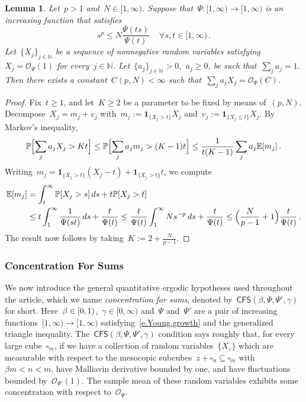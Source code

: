 \documentclass[11pt,twoside]{article} %
\let\oldsquare\square %
\renewcommand{\square}{\oldsquare}
\numberwithin{equation}{section}
\newtheorem{lemma}[theorem]{Lemma}
\theoremstyle{definition}
\let\originalleft\left
\let\originalright\right
\renewcommand{\left}{\mathopen{}\mathclose\bgroup\originalleft}
\renewcommand{\right}{\aftergroup\egroup\originalright}
\newcommand*{\N}{\ensuremath{\mathbb{N}}}
\newcommand{\cu}{\square}
\renewcommand{\P}{\mathbb{P}}
\newcommand{\E}{\mathbb{E}}
\renewcommand{\O}{\mathcal{O}}
\newcommand{\indc}{\boldsymbol{1}}
\newcommand{\CFS}{\mathsf{CFS}}
\begin{document}
\begin{lemma} 
\label{e.supp.you.up}
Let~$p>1$ and~$N \in [1,\infty)$. Suppose that~$\Psi:[1,\infty) \to [1,\infty)$ is an increasing function that satisfies
\begin{equation}  \label{e.Psi.pgrowth.supplementary1}
s^p \leq N \frac{\Psi(t s)}{\Psi(t)}\,
\quad \forall s, t \in [1,\infty) \,.
\end{equation}
Let~$\{ X_j \}_{j\in\N}$ be a sequence of nonnegative random variables satisfying~$X_j = \O_{\Psi}(1)$ for every~$j \in \N$. Let~$\{ a_j\}_{j \in \N}>0$,~$a_j \geq 0$, be such that~$\sum_j a_j =1$. Then there exists a constant~$C(p,N) < \infty$ such that~$\sum_{j} a_j X_j = \O_\Psi(C)$.  
\end{lemma}
\begin{proof}
Fix~$t \geq 1$, and let~$K\geq 2$ be a parameter to be fixed by means of~$(p,N)$. Decompose~$X_j = m_j + v_j$ with~$m_j := \indc_{\{X_j>t \} } X_j$ and~$v_j := \indc_{\{X_j \leq t \} } X_j$. By Markov's inequality, 
\begin{equation*}  
\P\Bigl[ \sum_j a_j X_j > K t  \Bigr] \leq \P\Bigl[ \sum_j a_j m_j > (K-1)t  \Bigr] 
\leq
\frac{1}{t(K-1)}\sum_{j} a_j \E[m_j]
\,.
\end{equation*}
Writing~$m_j = \indc_{\{X_j > t \} } (X_j -t) + \indc_{\{X_j > t \} } t$, we compute
\begin{align*}  
\E[m_j] 
& 
= 
\int_{t}^{\infty} \P[X_j  > s ] \, ds + t \P [ X_j > t]
\\ & 
\leq  
t \int_{1}^{\infty} \frac{1}{\Psi(s t)} \, ds +  \frac{t}{\Psi(t)} 
\leq  
\frac{t}{\Psi(t)} \int_{1}^{\infty} N s^{-p} \, ds +   \frac{t}{\Psi(t)}
\leq  
\Bigl( \frac{N}{p-1} +1 \Bigr) \frac{t}{\Psi(t)} 
\,.
\end{align*}
The result now follows by taking~$K := 2 + \frac{N}{p-1}$.
\end{proof}




\subsubsection{Concentration For Sums}
We now introduce the general quantitative ergodic hypotheses used throughout the article, which we name \emph{concentration for sums}, denoted by~$\CFS(\beta,\Psi,\Psi',\gamma)$ for short. 
Here~$\beta \in \left[0,1\right)$,~$\gamma\in [0,\infty)$ and~$\Psi$ and~$\Psi'$ are a pair of increasing functions~$[1,\infty) \to [1,\infty)$ satisfying~\eqref{e.Young.growth} and the generalized triangle inequality.
The~$\CFS(\beta,\Psi,\Psi',\gamma)$ condition says roughly that, for every large cube~$\cu_m$, if we have a collection of random variables~$\{ X_z\}$ which are measurable with respect to the mesocopic subcubes~$z+\cu_n \subseteq \cu_m$ with~$\beta m < n < m$, have Malliavin derivative bounded by one, and have fluctuations bounded by~$\O_{\Psi'}(1)$. The sample mean of these random variables exhibits some concentration with respect to~$\O_\Psi$.
\end{document}
